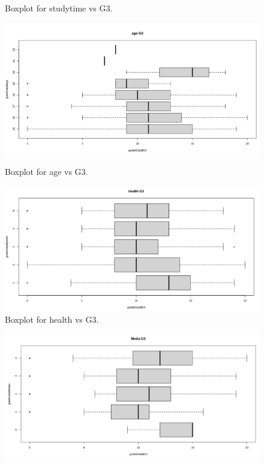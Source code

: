 \documentclass[a4paper]{article}
\begin{document}
\begin{enumerate}
\begin{figure}[H]
\begin{minipage}{0.5\textwidth}
            \caption{Boxplot for studytime vs G3.}
            \label{fig:boxplot5}
        \end{minipage}
    \end{figure}
    \begin{figure}[H]
        \centering
        \begin{minipage}{0.5\textwidth}
            \centering
            \includegraphics[width = 1\linewidth]{Images/26.PNG}
            \caption{Boxplot for age vs G3.}
            \label{fig:boxplot6}
        \end{minipage}%
        \begin{minipage}{0.5\textwidth}
            \centering
            \includegraphics[width = 1\linewidth]{Images/27.PNG}
            \caption{Boxplot for health vs G3.}
            \label{fig:boxplot7}
        \end{minipage}
    \end{figure}
    \begin{figure}[H]
        \centering
        \begin{minipage}{0.5\textwidth}
            \centering
            \includegraphics[width = 1\linewidth]{Images/28.PNG}

\end{minipage}
\end{figure}
\end{enumerate}
\end{document}
